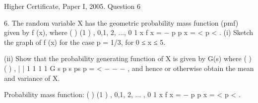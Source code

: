 \documentclass[a4paper,12pt]{article}
\begin{document}
Higher Certificate, Paper I, 2005. Question 6
\begin{framed}
6. The random variable X has the geometric probability mass function (pmf) given by
f (x), where
( ) (1 ) , 0,1, 2, ..., 0 1 x f x = − p p x = < p < .
(i) Sketch the graph of f (x) for the case p = 1/3, for 0 ≤ x ≤ 5.

(ii) Show that the probability generating function of X is given by G(s) where
( ) ( )
, | | 1
1 1 1
G s p s
ps p
= <
− − −
,
and hence or otherwise obtain the mean and variance of X.
\end{framed}

Probability mass function: ( ) (1 ) , 0,1, 2, ... , 0 1 x f x = − p p x = < p < .
\end{document}
